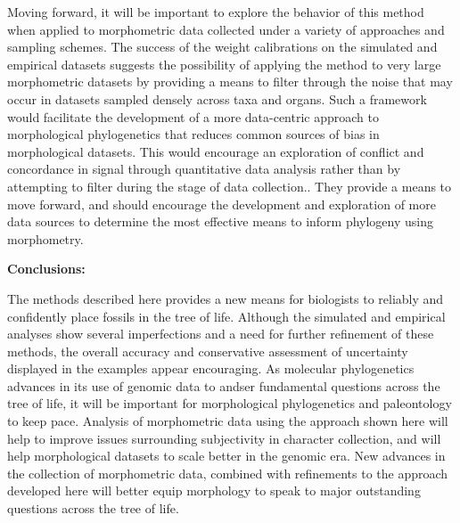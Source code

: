 \documentclass[12pt]{article}
\begin{document}
Moving forward, it will be important to explore the behavior of this
method when applied to morphometric data collected under a variety of
approaches and sampling schemes. The success of the weight calibrations
on the simulated and empirical datasets suggests the possibility of
applying the method to very large morphometric datasets by providing a
means to filter through the noise that may occur in datasets sampled
densely across taxa and organs. Such a framework would facilitate the
development of a more data-centric approach to morphological
phylogenetics that reduces common sources of bias in morphological
datasets. This would encourage an exploration of conflict and
concordance in signal through quantitative data analysis rather than by
attempting to filter during the stage of data collection.. They provide
a means to move forward, and should encourage the development and
exploration of more data sources to determine the most effective means
to inform phylogeny using morphometry.

\textbf{Conclusions:}

The methods described here provides a new means for biologists to
reliably and confidently place fossils in the tree of life. Although the
simulated and empirical analyses show several imperfections and a need
for further refinement of these methods, the overall accuracy and
conservative assessment of uncertainty displayed in the examples appear
encouraging. As molecular phylogenetics advances in its use of genomic
data to andser fundamental questions across the tree of life, it will be
important for morphological phylogenetics and paleontology to keep pace.
Analysis of morphometric data using the approach shown here will help to
improve issues surrounding subjectivity in character collection, and
will help morphological datasets to scale better in the genomic era. New
advances in the collection of morphometric data, combined with
refinements to the approach developed here will better equip morphology
to speak to major outstanding questions across the tree of life.
\end{document}
